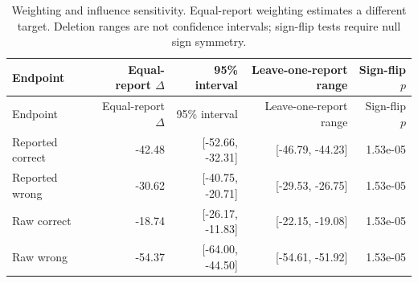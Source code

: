 {\small\setlength{\tabcolsep}{3pt}\begin{longtable}{lrrrr}
\caption{Weighting and influence sensitivity. Equal-report weighting estimates a different target. Deletion ranges are not confidence intervals; sign-flip tests require null sign symmetry.}\\
Endpoint & Equal-report $\Delta$ & 95\% interval & Leave-one-report range & Sign-flip $p$\\\toprule\endfirsthead
Endpoint & Equal-report $\Delta$ & 95\% interval & Leave-one-report range & Sign-flip $p$\\\toprule\endhead
Reported correct & -42.48 & [-52.66, -32.31] & [-46.79, -44.23] & 1.53e-05\\
Reported wrong & -30.62 & [-40.75, -20.71] & [-29.53, -26.75] & 1.53e-05\\
Raw correct & -18.74 & [-26.17, -11.83] & [-22.15, -19.08] & 1.53e-05\\
Raw wrong & -54.37 & [-64.00, -44.50] & [-54.61, -51.92] & 1.53e-05\\
\bottomrule\end{longtable}}